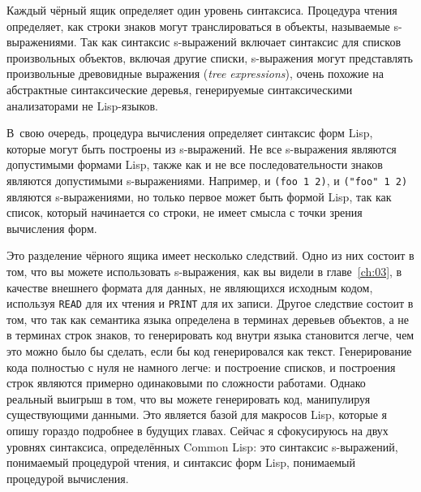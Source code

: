 Каждый чёрный ящик определяет один уровень синтаксиса. Процедура чтения определяет, как
строки знаков могут транслироваться в объекты, называемые s-выражениями. Так как синтаксис
s-выражений включает синтаксис для списков произвольных объектов, включая другие списки,
s-выражения могут представлять произвольные древовидные выражения (\textit{tree
  expressions}), очень похожие на абстрактные синтаксические деревья, генерируемые
синтаксическими анализаторами не Lisp-языков.

В~свою очередь, процедура вычисления определяет синтаксис форм Lisp, которые могут быть
построены из s-выражений. Не все s-выражения являются допустимыми формами Lisp, также как и
не все последовательности знаков являются допустимыми s-выражениями. Например, и
\lstinline{(foo 1 2)}, и \lstinline{("foo" 1 2)} являются s-выражениями, но только первое может быть
формой Lisp, так как список, который начинается со строки, не имеет смысла с точки зрения
вычисления форм.

Это разделение чёрного ящика имеет несколько следствий. Одно из них состоит в том, что вы
можете использовать s-выражения, как вы видели в главе~\ref{ch:03}, в качестве внешнего формата для
данных, не являющихся исходным кодом, используя \lstinline{READ} для их чтения и
\lstinline{PRINT} для их записи.  Другое следствие состоит в том, что так как семантика языка
определена в терминах деревьев объектов, а не в терминах строк знаков, то генерировать код
внутри языка становится легче, чем это можно было бы сделать, если бы код генерировался
как текст. Генерирование кода полностью с нуля не намного легче: и построение списков, и
построения строк являются примерно одинаковыми по сложности работами. Однако реальный
выигрыш в том, что вы можете генерировать код, манипулируя существующими данными. Это
является базой для макросов Lisp, которые я опишу гораздо подробнее в будущих
главах. Сейчас я сфокусируюсь на двух уровнях синтаксиса, определённых Common Lisp: это
синтаксис s-выражений, понимаемый процедурой чтения, и синтаксис форм Lisp, понимаемый
процедурой вычисления.


